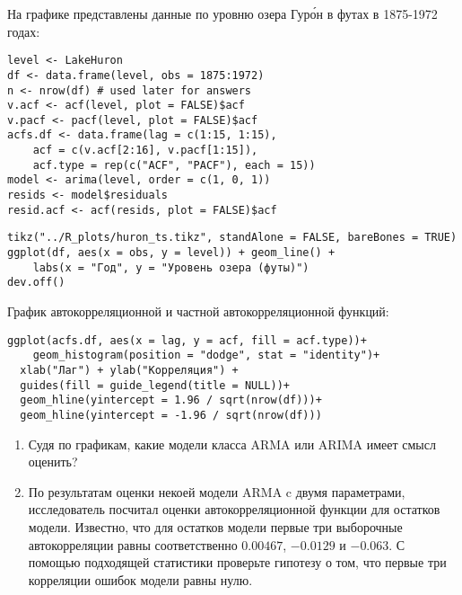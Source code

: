 \begin{problem}
На графике представлены данные по уровню озера Гур\'{о}н в футах в 1875-1972 годах:

\begin{verbatim}
level <- LakeHuron
df <- data.frame(level, obs = 1875:1972)
n <- nrow(df) # used later for answers
v.acf <- acf(level, plot = FALSE)$acf
v.pacf <- pacf(level, plot = FALSE)$acf
acfs.df <- data.frame(lag = c(1:15, 1:15),
    acf = c(v.acf[2:16], v.pacf[1:15]),
    acf.type = rep(c("ACF", "PACF"), each = 15))
model <- arima(level, order = c(1, 0, 1))
resids <- model$residuals
resid.acf <- acf(resids, plot = FALSE)$acf
\end{verbatim}



\begin{verbatim}
tikz("../R_plots/huron_ts.tikz", standAlone = FALSE, bareBones = TRUE)
ggplot(df, aes(x = obs, y = level)) + geom_line() +
    labs(x = "Год", y = "Уровень озера (футы)")
dev.off()
\end{verbatim}


%




График автокорреляционной и частной автокорреляционной функций:

\begin{verbatim}
ggplot(acfs.df, aes(x = lag, y = acf, fill = acf.type))+
    geom_histogram(position = "dodge", stat = "identity")+
  xlab("Лаг") + ylab("Корреляция") +
  guides(fill = guide_legend(title = NULL))+
  geom_hline(yintercept = 1.96 / sqrt(nrow(df)))+
  geom_hline(yintercept = -1.96 / sqrt(nrow(df)))
\end{verbatim}


\begin{enumerate}
\item Судя по графикам, какие модели класса ARMA или ARIMA имеет смысл оценить?
\item По результатам оценки некоей модели ARMA c двумя параметрами, исследователь посчитал оценки автокорреляционной функции для остатков модели. Известно, что для остатков модели первые три выборочные автокорреляции равны соответственно $0.00467$, $-0.0129$ и $-0.063$. С помощью подходящей статистики проверьте гипотезу о том, что первые три корреляции ошибок модели равны нулю.
\end{enumerate}



\end{problem}
